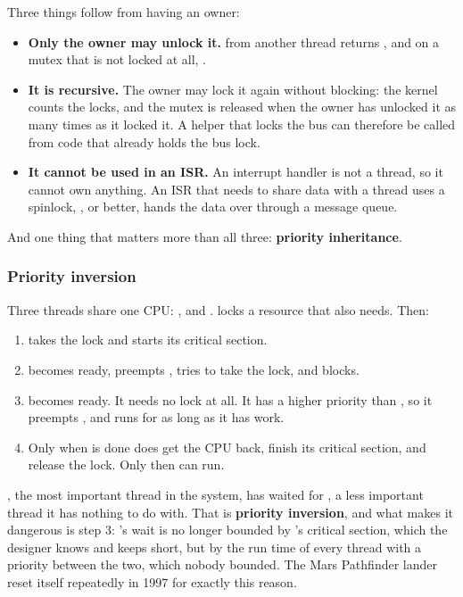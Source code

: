 \noindent Three things follow from having an owner:

\begin{itemize}
  \item \textbf{Only the owner may unlock it.}  from another thread returns
    , and on a mutex that is not locked at all, .
  \item \textbf{It is recursive.} The owner may lock it again without blocking: the kernel counts the locks,
    and the mutex is released when the owner has unlocked it as many times as it locked it. A helper
    that locks the bus can therefore be called from code that already holds the bus lock.
  \item \textbf{It cannot be used in an ISR.} An interrupt handler is not a thread, so it cannot own
    anything. An ISR that needs to share data with a thread uses a spinlock, , or
    better, hands the data over through a message queue.
\end{itemize}

And one thing that matters more than all three: \textbf{priority inheritance}.

\subsubsection{Priority inversion}
Three threads share one CPU: ,  and .  locks a resource
that  also needs. Then:

\begin{enumerate}
  \item {} takes the lock and starts its critical section.
  \item {} becomes ready, preempts , tries to take the lock, and blocks.
  \item {} becomes ready. It needs no lock at all. It has a higher priority than , so
    it preempts , and runs for as long as it has work.
  \item Only when  is done does  get the CPU back, finish its critical section, and
    release the lock. Only then can  run.
\end{enumerate}

, the most important thread in the system, has waited for , a less important
thread it has nothing to do with. That is \textbf{priority inversion}, and what makes it dangerous
is step 3: ’s wait is no longer bounded by ’s critical section, which the
designer knows and keeps short, but by the run time of every thread with a priority between the two,
which nobody bounded. The Mars Pathfinder lander reset itself repeatedly in 1997 for exactly this
reason.

